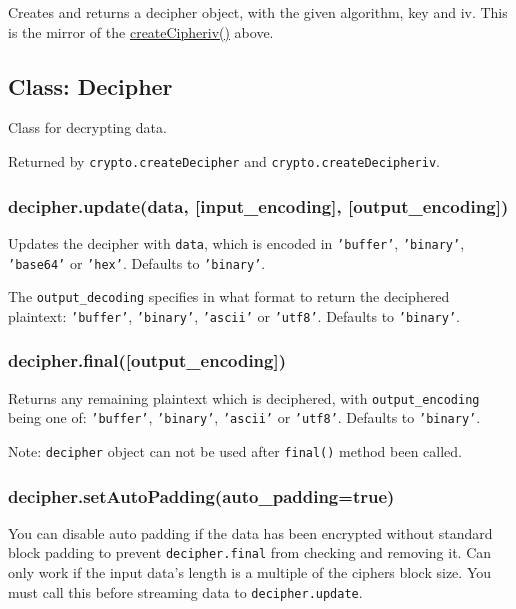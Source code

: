 Creates and returns a decipher object, with the given algorithm, key and
iv. This is the mirror of the
\hyperref[crypto\_crypto\_createcipheriv\_algorithm\_key\_iv]{createCipheriv()}
above.

\subsection{Class: Decipher}

Class for decrypting data.

Returned by \texttt{crypto.createDecipher} and
\texttt{crypto.createDecipheriv}.

\subsubsection{decipher.update(data, {[}input\_encoding{]},
{[}output\_encoding{]})}

Updates the decipher with \texttt{data}, which is encoded in
\texttt{'buffer'}, \texttt{'binary'}, \texttt{'base64'} or
\texttt{'hex'}. Defaults to \texttt{'binary'}.

The \texttt{output\_decoding} specifies in what format to return the
deciphered plaintext: \texttt{'buffer'}, \texttt{'binary'},
\texttt{'ascii'} or \texttt{'utf8'}. Defaults to \texttt{'binary'}.

\subsubsection{decipher.final({[}output\_encoding{]})}

Returns any remaining plaintext which is deciphered, with
\texttt{output\_encoding} being one of: \texttt{'buffer'},
\texttt{'binary'}, \texttt{'ascii'} or \texttt{'utf8'}. Defaults to
\texttt{'binary'}.

Note: \texttt{decipher} object can not be used after \texttt{final()}
method been called.

\subsubsection{decipher.setAutoPadding(auto\_padding=true)}

You can disable auto padding if the data has been encrypted without
standard block padding to prevent \texttt{decipher.final} from checking
and removing it. Can only work if the input data's length is a multiple
of the ciphers block size. You must call this before streaming data to
\texttt{decipher.update}.

